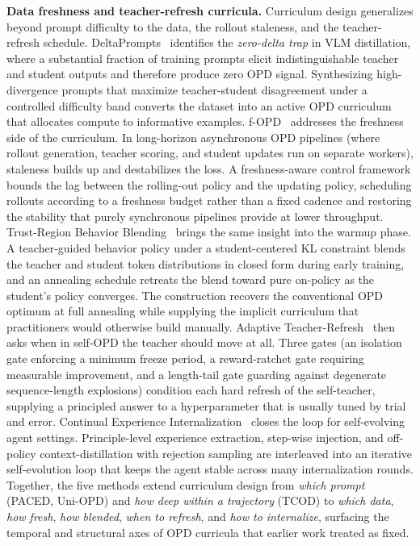 \documentclass{article} %
\begin{document}
\textbf{Data freshness and teacher-refresh curricula.} Curriculum design generalizes beyond prompt difficulty to the data, the rollout staleness, and the teacher-refresh schedule. DeltaPrompts~\citep{2605.15532} identifies the \emph{zero-delta trap} in VLM distillation, where a substantial fraction of training prompts elicit indistinguishable teacher and student outputs and therefore produce zero OPD signal. Synthesizing high-divergence prompts that maximize teacher-student disagreement under a controlled difficulty band converts the dataset into an active OPD curriculum that allocates compute to informative examples. f-OPD~\citep{2605.17862} addresses the freshness side of the curriculum. In long-horizon asynchronous OPD pipelines (where rollout generation, teacher scoring, and student updates run on separate workers), staleness builds up and destabilizes the loss. A freshness-aware control framework bounds the lag between the rolling-out policy and the updating policy, scheduling rollouts according to a freshness budget rather than a fixed cadence and restoring the stability that purely synchronous pipelines provide at lower throughput. Trust-Region Behavior Blending~\citep{2605.31159} brings the same insight into the warmup phase. A teacher-guided behavior policy under a student-centered KL constraint blends the teacher and student token distributions in closed form during early training, and an annealing schedule retreats the blend toward pure on-policy as the student's policy converges. The construction recovers the conventional OPD optimum at full annealing while supplying the implicit curriculum that practitioners would otherwise build manually. Adaptive Teacher-Refresh~\citep{2606.03532} then asks when in self-OPD the teacher should move at all. Three gates (an isolation gate enforcing a minimum freeze period, a reward-ratchet gate requiring measurable improvement, and a length-tail gate guarding against degenerate sequence-length explosions) condition each hard refresh of the self-teacher, supplying a principled answer to a hyperparameter that is usually tuned by trial and error. Continual Experience Internalization~\citep{2606.04703} closes the loop for self-evolving agent settings. Principle-level experience extraction, step-wise injection, and off-policy context-distillation with rejection sampling are interleaved into an iterative self-evolution loop that keeps the agent stable across many internalization rounds. Together, the five methods extend curriculum design from \emph{which prompt} (PACED, Uni-OPD) and \emph{how deep within a trajectory} (TCOD) to \emph{which data}, \emph{how fresh}, \emph{how blended}, \emph{when to refresh}, and \emph{how to internalize}, surfacing the temporal and structural axes of OPD curricula that earlier work treated as fixed.
\end{document}
